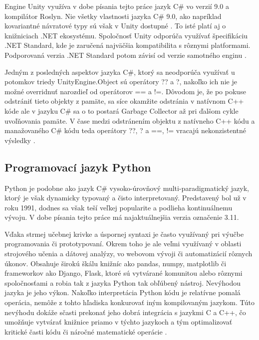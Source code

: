 \documentclass[slovak, master]{diploma}
\begin{document}
Engine Unity využíva v dobe písania tejto práce jazyk C\# vo verzií 9.0 a kompilátor Roslyn. Nie všetky vlastnosti jazyka C\# 9.0, ako napríklad kovariantné návratové typy sú však v Unity dostupné \cite{compiler}. To isté platí aj o knižniciach .NET ekosystému. Spoločnosť Unity odporúča využívať špecifikáciu .NET Standard, kde je zaručená najväčšia kompatibilita s rôznymi platformami. Podporovaná verzia .NET Standard potom závisí od verzie samotného enginu \cite{netUnity}. 

Jedným z posledných aspektov jazyka C\#, ktorý sa neodporúča využívať u potomkov triedy UnityEngine.Object sú operátory ?? a ?, nakoľko ich nie je možné overridnuť narozdieľ od operátorov == a !=. Dôvodom je, že po pokuse odstrániť tieto objekty z pamäte, sa síce okamžite odstránia v natívnom C++ kóde ale v jazyku C\# sa o to postará Garbage Collector až pri ďalšom cykle uvoľňovania pamäte. V čase medzi odstránením objektu z natívneho C++ kódu a manažovaného C\# kódu teda operátory ??, ? a ==, != vracajú nekonzistentné výsledky \cite{netUnity}.

\subsection{Programovací jazyk Python}
\label{sec:langsPython}
Python je podobne ako jazyk C\# vysoko-úrovňový multi-paradigmatický jazyk, ktorý je však dynamicky typovaný a čisto interpretovaný. Predstavený bol už v roku 1991, dodnes sa však teší veľkej popularite a podlieha kontinuálnemu vývoju. V dobe písania tejto práce má najaktuálnejšia verzia označenie 3.11. 

Vďaka strmej učebnej krivke a úspornej syntaxi je často využívaný pri výučbe programovania či prototypovaní. Okrem toho je ale veľmi využívaný v oblasti strojového učenia a dátovej analýzy, vo webovom vývoji či automatizácií rôznych úkonov. Obsahuje širokú škálu knižníc ako pandas, numpy, matplotlib či frameworkov ako Django, Flask, ktoré sú vytvárané komunitou alebo rôznymi spoločnosťami a robia tak z jazyka Python tak obľúbený nástroj. Nevýhodou jazyka je jeho výkon. Nakoľko interpretácia Python kódu je relatívne pomalá operácia, nemôže z tohto hľadiska konkurovať iným kompilovaným jazykom. Túto nevýhodu dokáže sčasti prekonať jeho dobrá integrácia s jazykmi C a C++, čo umožňuje vytvárať knižnice priamo v týchto jazykoch a tým optimalizovať kritické časti kódu či náročné matematické operácie \cite{pajton}.
\end{document}
